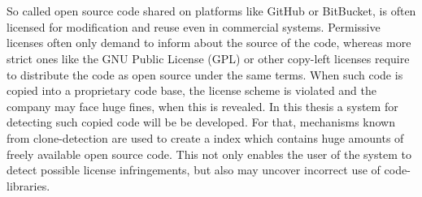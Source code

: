 \chapter{\abstractname}

So called open source code shared on platforms like GitHub or BitBucket, is often licensed for modification and reuse even in commercial systems.
Permissive licenses often only demand to inform about the source of the code, whereas more strict ones like the GNU Public License (GPL) or other copy-left licenses require to distribute the code as open source under the same terms.
When such code is copied into a proprietary code base, the license scheme is violated and the company may face huge fines, when this is revealed.
In this thesis a system for detecting such copied code will be be developed.
For that, mechanisms known from clone-detection are used to create a index which contains huge amounts of freely available open source code.
This not only enables the user of the system to detect possible license infringements, but also may uncover incorrect use of code-libraries.

